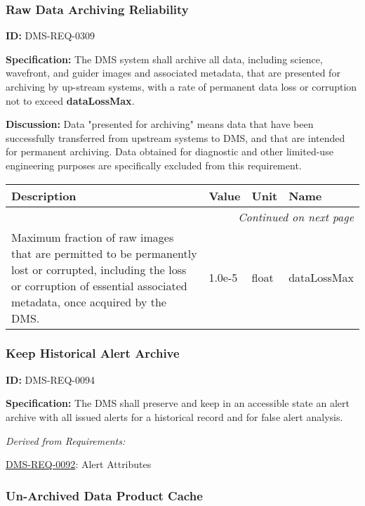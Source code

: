 \documentclass[SE,toc,lsstdraft]{lsstdoc}
\makeatletter
\newcommand{\paramname}[1]{\hspace{0pt}#1}
\newcommand{\unitname}[1]{\hspace{0pt}#1}
\newenvironment{parameters}[0]{%
\setlength\LTleft{0pt}
\setlength\LTright{\fill}
\begin{small}
\begin{longtable}[]{|p{0.5\textwidth}|l|p{0.6in}|p{1.74in}@{}|}

\hline \textbf{Description} & \textbf{Value} & \textbf{Unit} & \textbf{Name} \\ \hline
\endhead

\hline \multicolumn{4}{r}{\emph{Continued on next page}} \\
\endfoot

\hline\hline
\endlastfoot
}{%
\hline
\end{longtable}
\end{small}
}
\makeatother
\begin{document}
\subsubsection{Raw Data Archiving Reliability}

\label{DMS-REQ-0309}
\textbf{ID:} DMS-REQ-0309

\textbf{Specification:} The DMS system shall archive all data, including science, wavefront, and guider images and associated metadata, that are presented for archiving by up-stream systems, with a rate of permanent data loss or corruption not to exceed \textbf{dataLossMax}.

\textbf{Discussion: }Data "presented for archiving" means data that have been successfully transferred from upstream systems to DMS, and that are intended for permanent archiving. Data obtained for diagnostic and other limited-use engineering purposes are specifically excluded from this requirement.



\begin{parameters}
Maximum fraction of raw images that are permitted to be permanently lost or corrupted, including the loss or corruption of essential associated metadata, once acquired by the DMS.
&
1.0e-5
&
\unitname{%
float
}
&
\paramname{%
dataLossMax
} \\\hline
\end{parameters}




\subsubsection{Keep Historical Alert Archive}

\label{DMS-REQ-0094}
\textbf{ID:} DMS-REQ-0094

\textbf{Specification: }The DMS shall preserve and keep in an accessible state an alert archive with all issued alerts for a historical record and for false alert analysis.






\emph{Derived from Requirements:}

\hyperref[DMS-REQ-0092]{DMS-REQ-0092}:
Alert Attributes \newline


\subsubsection{Un-Archived Data Product Cache}
\end{document}
